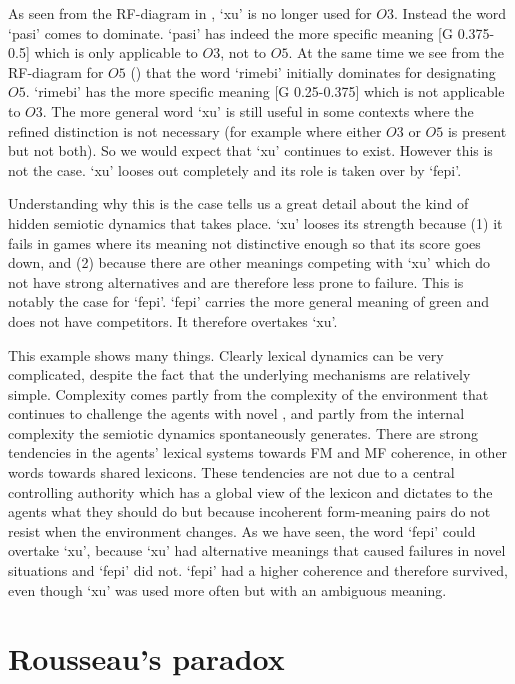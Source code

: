 As seen from the RF-diagram in , `xu' is no
longer used for $O3$. Instead the word `pasi' comes to 
dominate. `pasi' has indeed the more specific 
meaning [G 0.375-0.5] which is only applicable to $O3$, 
not to $O5$. At the same time we see from the RF-diagram 
for $O5$ ()
that the word `rimebi' initially dominates for designating $O5$. 
`rimebi' has the more specific meaning [G 0.25-0.375] which 
is not applicable to $O3$. 
The more general word `xu' is still useful in some 
contexts where the
refined distinction is not necessary (for example where 
either $O3$ or $O5$ is present but not both). So we would expect
that `xu' continues to exist. However this is not the case. `xu'
looses out completely and its role is taken over by `fepi'. 

Understanding why this is the case
tells us a great detail about the kind 
of hidden semiotic dynamics that takes place. `xu' looses its
strength because (1) it fails in games where its meaning
not distinctive enough so that its score goes
down, and (2) because there 
are other meanings competing with `xu' which do not 
have strong alternatives and are therefore
less prone to failure. This is notably the case for
`fepi'. `fepi' carries the more general meaning of green
and does not have competitors. It therefore overtakes
`xu'. 

This example shows many things. Clearly
lexical dynamics can be very complicated, despite the 
fact that the underlying mechanisms are relatively 
simple. Complexity comes partly from the complexity of
the environment that continues to challenge the agents
with novel , and partly from the internal 
complexity the semiotic dynamics spontaneously generates. 
There are strong tendencies in the agents' lexical systems
towards FM and MF coherence, 
in other words towards shared lexicons. These tendencies
are not due to a central controlling authority which 
has a global view of the lexicon and dictates to the 
agents what they should do but because incoherent 
form-meaning pairs do not resist when the environment 
changes. As we have seen, the word `fepi' could 
overtake `xu', because `xu' had alternative meanings that 
caused failures in novel situations and `fepi' did not. 
`fepi' had a higher coherence and therefore survived, even
though `xu' was used more often but with an 
ambiguous meaning. 

\section{Rousseau's paradox}


